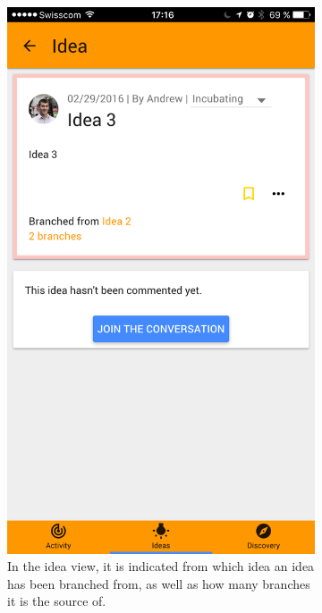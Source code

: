 \documentclass[a4paper,12pt, oneside]{article}
\begin{document}
\begin{figure}[!htb]
    \null\hfill
    \begin{subfigure}[t]{.32\textwidth}
        \includegraphics[width=\textwidth]{images/branches_idea.png}
        \caption{In the idea view, it is indicated from which idea an idea has been branched from, as well as how many branches it is the source of.}
    \end{subfigure}
    \hfill
    \begin{subfigure}[t]{.32\textwidth}

\end{subfigure}
\end{figure}
\end{document}
